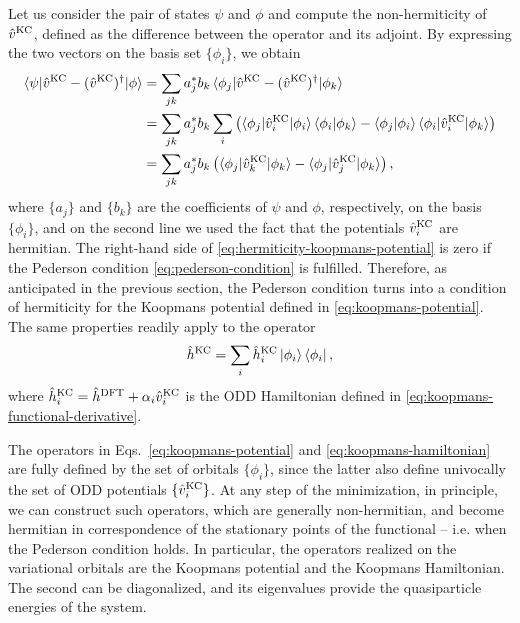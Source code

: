 Let us consider the pair of states $\psi$ and $\phi$ and compute the non-hermiticity of $\hat{v}^{\rm KC}$, defined as the difference between the operator and its adjoint. By expressing the two vectors on the basis set $\{ \phi_i \}$, we obtain
%
\begin{equation}
    \begin{split}
    \braket{\psi|\hat{v}^{\rm KC} - (\hat{v}^{\rm KC})^{\dagger}|\phi} &= \sum_{jk} a_j^* b_k \braket{\phi_j|\hat{v}^{\rm KC} - (\hat{v}^{\rm KC})^{\dagger}|\phi_k} \\
    &= \sum_{jk} a_j^* b_k \sum_i \left( \braket{\phi_j|\hat{v}_i^{\rm KC}|\phi_i}\braket{\phi_i|\phi_k} - \braket{\phi_j|\phi_i}\braket{\phi_i|\hat{v}_i^{\rm KC}|\phi_k} \right) \\
    &= \sum_{jk} a_j^* b_k \left( \braket{\phi_j|\hat{v}_k^{\rm KC}|\phi_k} - \braket{\phi_j|\hat{v}_j^{\rm KC}|\phi_k} \right) ,
    \end{split}
    \label{eq:hermiticity-koopmans-potential}
\end{equation}
%
where $\{ a_j \}$ and $\{ b_k \}$ are the coefficients of $\psi$ and $\phi$, respectively, on the basis $\{ \phi_i \}$, and on the second line we used the fact that the potentials $\hat{v}_i^{\rm KC}$ are hermitian. The right-hand side of \cref{eq:hermiticity-koopmans-potential} is zero if the Pederson condition \eqref{eq:pederson-condition} is fulfilled. Therefore, as anticipated in the previous section, the Pederson condition turns into a condition of hermiticity for the Koopmans potential defined in \cref{eq:koopmans-potential}. The same properties readily apply to the operator
%
\begin{equation}
    \hat{h}^{\rm KC} = \sum_i \hat{h}_i^{\rm KC} \ket{\phi_i} \bra{\phi_i} ,
    \label{eq:koopmans-hamiltonian}
\end{equation}
%
where $\hat{h}_i^{\rm KC} = \hat{h}^{\rm DFT} + \alpha_i \hat{v}_i^{\rm KC}$ is the ODD Hamiltonian defined in \cref{eq:koopmans-functional-derivative}.

The operators in Eqs.~\eqref{eq:koopmans-potential} and \eqref{eq:koopmans-hamiltonian} are fully defined by the set of orbitals $\{ \phi_i \}$, since the latter also define univocally the set of ODD potentials $\{ \hat{v}_i^{\rm KC} \}$. At any step of the minimization, in principle, we can construct such operators, which are generally non-hermitian, and become hermitian in correspondence of the stationary points of the functional -- i.e. when the Pederson condition holds. In particular, the operators realized on the variational orbitals are the Koopmans potential and the Koopmans Hamiltonian. The second can be diagonalized, and its eigenvalues provide the quasiparticle energies of the system.

